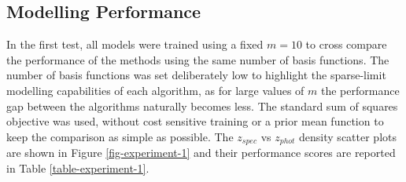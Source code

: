 \documentclass[useAMS,usenatbib,fleqn]{mn2e}
\begin{document}
\subsection{Modelling Performance}

In the first test, all models were trained using a fixed $m=10$ to cross compare the performance of the methods using the same number of basis functions. The number of basis functions was set deliberately low to highlight the sparse-limit modelling capabilities of each algorithm, as for large values of $m$ the performance gap between the algorithms naturally becomes less. The standard sum of squares objective was used, without cost sensitive training or a prior mean function to keep the comparison as simple as possible. The $z_{spec}$ vs $z_{phot}$ density scatter plots are shown in Figure \ref{fig-experiment-1} and their performance scores are reported in Table \ref{table-experiment-1}.
\end{document}
